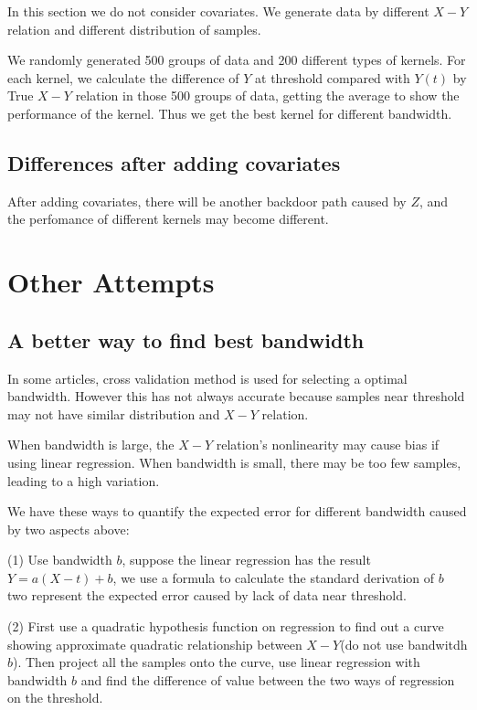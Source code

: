 \documentclass[a4 paper,12pt]{article}
\begin{document}
In this section we do not consider covariates. We generate data by different $X-Y$ relation and different distribution of samples. 

We randomly generated 500 groups of data and 200 different types of kernels. For each kernel, we calculate the difference of $Y$ at threshold compared with $Y(t)$ by True $X-Y$ relation in those 500 groups of data, getting the average to show the performance of the kernel. Thus we get the best kernel for different bandwidth.

\subsection{ Differences after adding covariates}
After adding covariates, there will be another backdoor path caused by $Z$, and the perfomance of different kernels may become different.


\section{Other Attempts}
\subsection*{A better way to find best bandwidth}

In some articles, cross validation method is used for selecting a optimal bandwidth. However this has not always accurate because samples near threshold may not have similar distribution and $X-Y$ relation.

When bandwidth is large, the $X-Y$ relation's nonlinearity may cause bias if using linear regression. When bandwidth is small, there may be too few samples, leading to a high variation.

We have these ways to quantify the expected error for different bandwidth caused by two aspects above:

(1) Use bandwidth $b$, suppose the linear regression has the result $Y=a(X-t)+b$, we use a formula to calculate the standard derivation of $b$ two represent the expected error caused by lack of data near threshold.

(2) First use a quadratic hypothesis function on regression to find out a curve showing approximate quadratic relationship between $X-Y$(do not use bandwitdh $b$). Then project all the samples onto the curve, use linear regression with bandwidth $b$ and find the difference of value between the two ways of regression on the threshold. 
\end{document}
